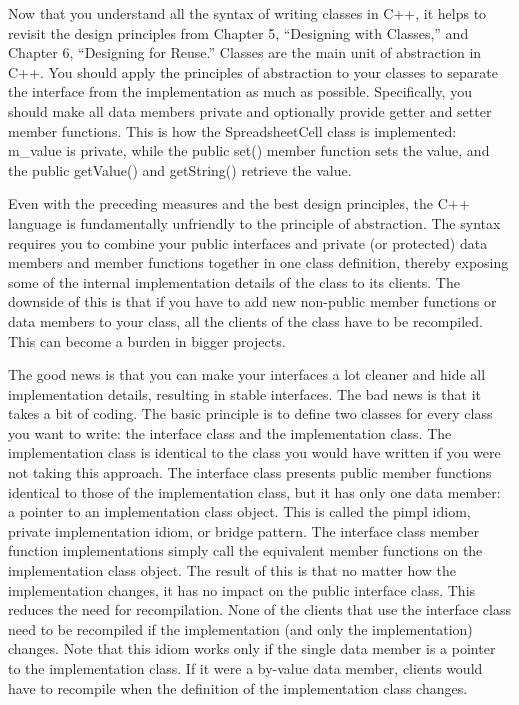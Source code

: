 
Now that you understand all the syntax of writing classes in C++, it helps to revisit the design principles from Chapter 5, “Designing with Classes,” and Chapter 6, “Designing for Reuse.” Classes are the main unit of abstraction in C++. You should apply the principles of abstraction to your classes to separate the interface from the implementation as much as possible. Specifically, you should make all data members private and optionally provide getter and setter member functions. This is how the SpreadsheetCell class is implemented: m\_value is private, while the public set() member function sets the value, and the public getValue() and getString() retrieve the value.


Even with the preceding measures and the best design principles, the C++ language is fundamentally unfriendly to the principle of abstraction. The syntax requires you to combine your public interfaces and private (or protected) data members and member functions together in one class definition, thereby exposing some of the internal implementation details of the class to its clients. The downside of this is that if you have to add new non-public member functions or data members to your class, all the clients of the class have to be recompiled. This can become a burden in bigger projects.

The good news is that you can make your interfaces a lot cleaner and hide all implementation details, resulting in stable interfaces. The bad news is that it takes a bit of coding. The basic principle is to define two classes for every class you want to write: the interface class and the implementation class. The implementation class is identical to the class you would have written if you were not taking this approach. The interface class presents public member functions identical to those of the implementation class, but it has only one data member: a pointer to an implementation class object. This is called the pimpl idiom, private implementation idiom, or bridge pattern. The interface class member function implementations simply call the equivalent member functions on the implementation class object. The result of this is that no matter how the implementation changes, it has no impact on the public interface class. This reduces the need for recompilation. None of the clients that use the interface class need to be recompiled if the implementation (and only the implementation) changes. Note that this idiom works only if the single data member is a pointer to the implementation class. If it were a by-value data member, clients would have to recompile when the definition of the implementation class changes.

